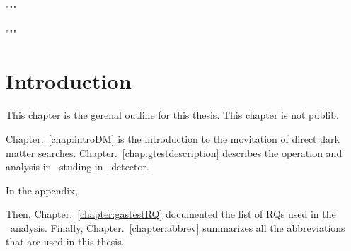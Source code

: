 """

"""
\chapter{Introduction}
\label{chap:intro}

This chapter is the gerenal outline for this thesis. This chapter is not publib.

Chapter.~\ref{chap:introDM} is the introduction to the movitation of direct dark matter searches.
Chapter.~\ref{chap:gtestdescription} describes the operation and analysis in \eee\ studing in \gtest\ detector.

In the appendix, 


Then, Chapter.~\ref{chapter:gastestRQ} documented the list of RQs used in the \gtest\ analysis. 
Finally, Chapter.~\ref{chapter:abbrev} summarizes all the abbreviations that are used in this thesis.
